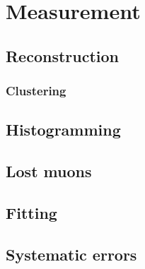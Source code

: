 
\chapter{\texorpdfstring{\wa}{wa} Measurement}
\label{chapter:SpinPrecessionMeasurement}
\thispagestyle{myheadings}


\section{Reconstruction}
\label{sec:ReconWest}

\cite{AFThesis}

\subsection{Clustering}
\label{sec:Clustering}

\section{Histogramming}
\label{sec:Histogramming}

\section{Lost muons}
\label{sec:lostmuons}

\section{Fitting}
\label{sec:Fitting}

\section{Systematic errors}
\label{sec:Systematic Errors}



\cleardoublepage
